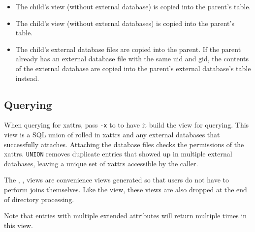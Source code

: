 \begin{itemize}
\item The child's \xattrsavail view (without external database) is
  copied into the parent's \xattrsrollup table.
\item The child's \xattrfiles view (without external databases) is
  copied into the parent's \xattrfilesrollup table.
\item The child's external database files are copied into the
  parent. If the parent already has an external database file with the
  same uid and gid, the contents of the external database are copied
  into the parent's external database's \xattrsrollup table instead.
\end{itemize}

\subsection{Querying}
When querying for xattrs, pass \texttt{-x} to \gufiquery to have it
build the \xattrs view for querying. This view is a SQL union of
rolled in xattrs and any external databases that successfully
attaches. Attaching the database files checks the permissions of the
xattrs. \texttt{UNION} removes duplicate entries that showed up in
multiple external databases, leaving a unique set of xattrs accessible
by the caller.

The \xentries, \xpentries, \xsummary views are convenience views
generated so that users do not have to perform joins themselves. Like
the \xattrs view, these views are also dropped at the end of directory
processing.

Note that entries with multiple extended attributes will return
multiple times in this view.
